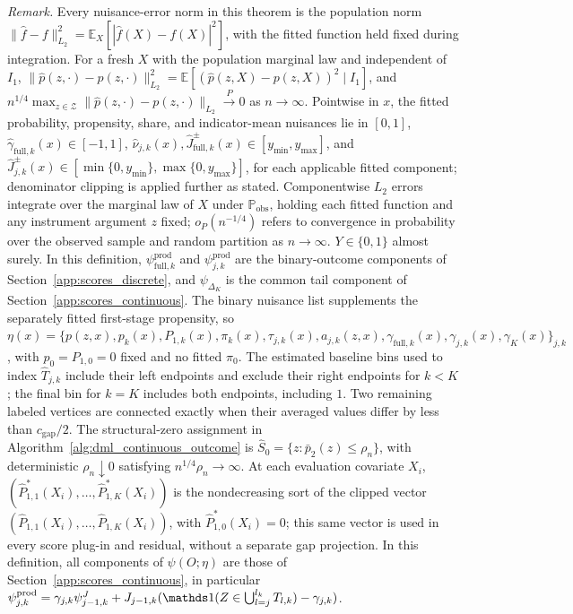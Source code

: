 \noindent\textit{Remark.} Every nuisance-error norm in this theorem is the population norm $\|\hat f-f\|_{L_2}^2=\mathbb E_X[|\hat f(X)-f(X)|^2]$, with the fitted function held fixed during integration. For a fresh $X$ with the population marginal law and independent of $I_1$, $\|\hat p(z,\cdot)-p(z,\cdot)\|_{L_2}^2=\mathbb E[(\hat p(z,X)-p(z,X))^2\mid I_1]$, and $n^{1/4}\max_{z\in\mathcal Z}\|\hat p(z,\cdot)-p(z,\cdot)\|_{L_2}\xrightarrow{P}0$ as $n\to\infty$. Pointwise in $x$, the fitted probability, propensity, share, and indicator-mean nuisances lie in $[0,1]$, $\hat\gamma_{\mathrm{full},k}(x)\in[-1,1]$, $\hat\nu_{j,k}(x),\hat J_{\mathrm{full},k}^{\pm}(x)\in[y_{\min},y_{\max}]$, and $\hat J_{j,k}^{\pm}(x)\in[\min\{0,y_{\min}\},\max\{0,y_{\max}\}]$, for each applicable fitted component; denominator clipping is applied further as stated. Componentwise $L_2$ errors integrate over the marginal law of $X$ under $\mathbb P_{\mathrm{obs}}$, holding each fitted function and any instrument argument $z$ fixed; $o_P(n^{-1/4})$ refers to convergence in probability over the observed sample and random partition as $n\to\infty$. $Y\in\{0,1\}$ almost surely. In this definition, $\psi_{\mathrm{full},k}^{\mathrm{prod}}$ and $\psi_{j,k}^{\mathrm{prod}}$ are the binary-outcome components of Section~\ref{app:scores_discrete}, and $\psi_{\Delta_K}$ is the common tail component of Section~\ref{app:scores_continuous}. The binary nuisance list supplements the separately fitted first-stage propensity, so $\eta(x)=\{p(z,x),p_k(x),P_{1,k}(x),\pi_k(x),\tau_{j,k}(x),a_{j,k}(z,x),\gamma_{\mathrm{full},k}(x),\gamma_{j,k}(x),\gamma_K(x)\}_{j,k}$, with $p_0=P_{1,0}=0$ fixed and no fitted $\pi_0$. The estimated baseline bins used to index $\widehat T_{j,k}$ include their left endpoints and exclude their right endpoints for $k<K$; the final bin for $k=K$ includes both endpoints, including $1$. Two remaining labeled vertices are connected exactly when their averaged values differ by less than $c_{\mathrm{gap}}/2$. The structural-zero assignment in Algorithm~\ref{alg:dml_continuous_outcome} is $\widehat S_0=\{z:\bar p_2(z)\leqslant\rho_n\}$, with deterministic $\rho_n\downarrow0$ satisfying $n^{1/4}\rho_n\to\infty$. At each evaluation covariate $X_i$, $(\hat P^*_{1,1}(X_i),\ldots,\hat P^*_{1,K}(X_i))$ is the nondecreasing sort of the clipped vector $(\hat P_{1,1}(X_i),\ldots,\hat P_{1,K}(X_i))$, with $\hat P^*_{1,0}(X_i)=0$; this same vector is used in every score plug-in and residual, without a separate gap projection. In this definition, all components of $\psi(O;\eta)$ are those of Section~\ref{app:scores_continuous}, in particular $\psi_{j,k}^{\mathrm{prod}}=\gamma_{j,k}\psi_{j-1,k}^{J}+J_{j-1,k}(\indicator(Z\in\bigcup_{l=j}^{l_k}T_{l,k})-\gamma_{j,k})$.


